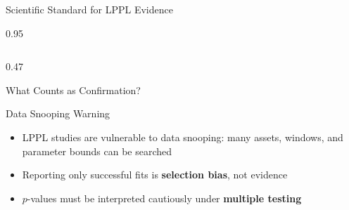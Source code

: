 \documentclass[9pt, aspectratio=169, t]{beamer}
\begin{document}
\begin{frame}{Scientific Standard for LPPL Evidence}
\begin{cminipage}{0.95\textwidth}
{\begin{columns}[T]
\begin{column}{0.47\textwidth}
\begin{block}{What Counts as Confirmation?}
            \end{block}
            \vspace{-2mm}
            \begin{alertblock}{Data Snooping Warning}
                \begin{itemize}\setlength{\itemsep}{0pt}
                    \item LPPL studies are vulnerable to data snooping: many assets, windows, and parameter bounds can be searched
                    \item Reporting only successful fits is \textbf{selection bias}, not evidence
                    \item $p$-values must be interpreted cautiously under \textbf{multiple testing}
                \end{itemize}
            \end{alertblock}
        \end{column}
    \end{columns}
    }
    \end{cminipage}
\end{frame}
\end{document}
